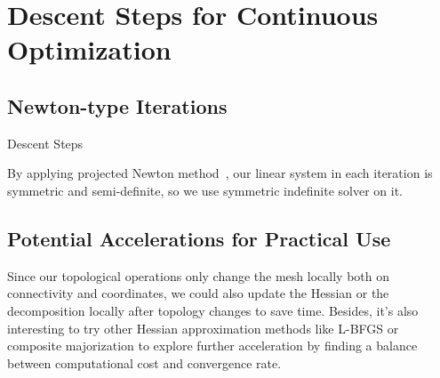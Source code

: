 \section{Descent Steps for Continuous Optimization}
\label{sec:descentStep}

\subsection{Newton-type Iterations}

\begin{algorithm}[h]
\SetAlgoLined
{}
\caption{Descent Steps}
\end{algorithm}
By applying projected Newton method~\cite{Teran2005Robust}, our linear system in each iteration is symmetric and semi-definite, so we use symmetric indefinite solver on it.


\subsection{Potential Accelerations for Practical Use}

Since our topological operations only change the mesh locally both on connectivity and coordinates, we could also update the Hessian or the decomposition locally after topology changes to save time. Besides, it's also interesting to try other Hessian approximation methods like L-BFGS \cite{Liu1989Limited} or composite majorization \cite{Shtengel2017Geometric} to explore further acceleration by finding a balance between computational cost and convergence rate.

